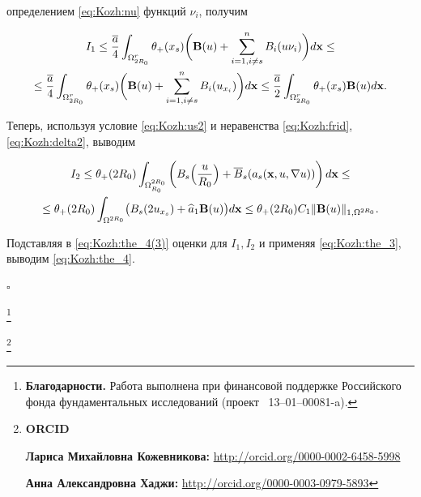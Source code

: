 определением \eqref{eq:Kozh:nu} функций ${\nu}_i$, получим

\begin{multline*}

  I_1\leq \frac{\overline{a}}{4}\int_{\Omega_{2R_0}^r}\theta_+ (x_s)\biggl(\mathbf{B}(u)+ \sum\limits_{i=1,i\neq s}^n B_i(u\nu_i)\biggr)d{\bf x}\leq

\\

 \leq \frac{\overline{a}}{4}\int_{\Omega_{2R_0}^r}\theta_+(x_s) \biggl(\mathbf{B}(u)+

 \sum\limits_{i=1,i\neq s}^n B_i(u_{x_i})\biggr)d{\bf x}\leq

\frac{\overline{a}}{2}

  \int_{\Omega_{2R_0}^r} \theta_+(x_s)\mathbf{B}(u) d{\bf x}.

\end{multline*}



  Теперь, используя условие \eqref{eq:Kozh:us2} и неравенства  \eqref{eq:Kozh:frid}, \eqref{eq:Kozh:delta2}, выводим

\begin{multline*}

  I_2\leq{\theta_+(2R_0)}

  \int_{\Omega_{R_0}^{2R_0}}\left(B_s\Bigl(\frac{u}{R_0}\Bigr)+\overline{B}_s(a_{s}({\bf x},u,\nabla

  u))\right)d{\bf x}\leq

\\

  \leq{\theta_+(2R_0)}

  \int_{\Omega^{2R_0}}\bigl(B_s(2u_{x_s})+\widehat{a}_1\mathbf{B}(u)\bigr)d{\bf x}\leq{\theta_+(2R_0)}C_1 \|\mathbf{B}(u)\|_{1,\Omega^{2R_0}}.

\end{multline*}

Подставляя в \eqref{eq:Kozh:the_4(3)} оценки для $I_1, I_2$ и применяя \eqref{eq:Kozh:the_3}, выводим \eqref{eq:Kozh:the_4}.

$\square$



\thanks{\textbf{Благодарности.} Работа выполнена при финансовой поддержке Российского фонда фундаментальных исследований (проект \No~13--01--00081-a).}





\thanks{{{\bf ORCID}







{\bf Лариса Михайловна Кожевникова:} \url{http://orcid.org/0000-0002-6458-5998}



{\bf Анна Александровна Хаджи:} \url{http://orcid.org/0000-0003-0979-5893}



}}









